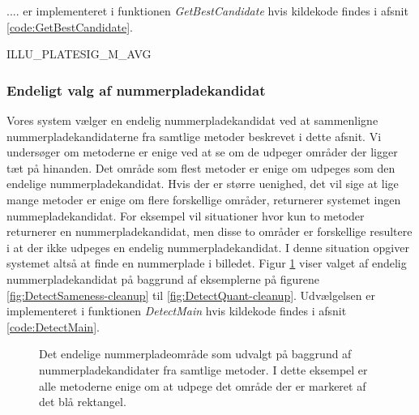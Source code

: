 .... er implementeret i funktionen \textit{GetBestCandidate} hvis kildekode findes i afsnit \ref{code:GetBestCandidate}.

ILLU\_PLATESIG\_M\_AVG

\subsubsection{Endeligt valg af nummerpladekandidat}
Vores system vælger en endelig nummerpladekandidat ved at sammenligne nummerpladekandidaterne fra samtlige metoder beskrevet i dette afsnit. Vi undersøger om metoderne er enige ved at se om de udpeger områder der ligger tæt på hinanden. Det område som flest metoder er enige om udpeges som den endelige nummerpladekandidat. Hvis der er større uenighed, det vil sige at lige mange metoder er enige om flere forskellige områder, returnerer systemet ingen nummepladekandidat. For eksempel vil situationer hvor kun to metoder returnerer en nummerpladekandidat, men disse to områder er forskellige resultere i at der ikke udpeges en endelig nummerpladekandidat. I denne situation opgiver systemet altså at finde en nummerplade i billedet. Figur \ref{fig:DetectMain-result} viser valget af endelig nummerpladekandidat på baggrund af eksemplerne på figurene \ref{fig:DetectSameness-cleanup} til \vref{fig:DetectQuant-cleanup}. Udvælgelsen er implementeret i funktionen \textit{DetectMain} hvis kildekode findes i afsnit \ref{code:DetectMain}.

\begin{figure}[htp]
  \centering
  \caption{Det endelige nummerpladeområde som udvalgt på baggrund af nummerpladekandidater fra samtlige metoder. I dette eksempel er alle metoderne enige om at udpege det område der er markeret af det blå rektangel.}
  \label{fig:DetectMain-result}  
\end{figure}


